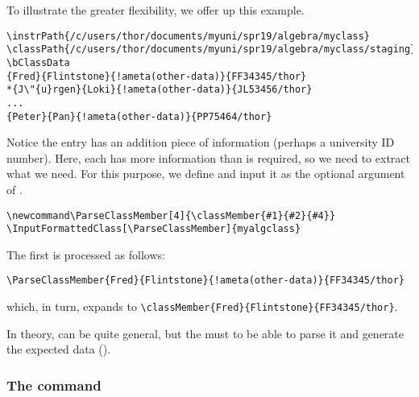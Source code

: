 \documentclass{article}
\let\tops\texorpdfstring
\edef\amtIndent{\the\parindent}
\begin{document}
To illustrate the greater flexibility, we offer up this example.
\begin{Verbatim}[xleftmargin=\amtIndent,fontsize=\small,commandchars=!()]
\instrPath{/c/users/thor/documents/myuni/spr19/algebra/myclass}
\classPath{/c/users/thor/documents/myuni/spr19/algebra/myclass/staging}
\bClassData
{Fred}{Flintstone}{!ameta(other-data)}{FF34345/thor}
*{J\"{u}rgen}{Loki}{!ameta(other-data)}{JL53456/thor}
...
{Peter}{Pan}{!ameta(other-data)}{PP75464/thor}
\end{Verbatim}
Notice the entry has an addition piece of information (perhaps a university ID number). Here,
each  has more information than is required, so we need to extract what we need.
For this purpose, we define  and input it as the optional argument
of .
\begin{Verbatim}[xleftmargin=\amtIndent,fontsize=\small,commandchars=!()]
\newcommand\ParseClassMember[4]{\classMember{#1}{#2}{#4}}
\InputFormattedClass[\ParseClassMember]{myalgclass}
\end{Verbatim}
The first  is processed as follows:
\begin{Verbatim}[xleftmargin=\amtIndent,fontsize=\small,commandchars=!()]
\ParseClassMember{Fred}{Flintstone}{!ameta(other-data)}{FF34345/thor}
\end{Verbatim}
which, in turn, expands to \verb~\classMember{Fred}{Flintstone}{FF34345/thor}~.

In theory,  can be quite general, but the  must to be able to parse
it and generate the expected data ().

\subsubsection{The \tops{\protect{}}{\textbackslash{sadQuizzes}} command}\label{sss:sadQs}
\end{document}
